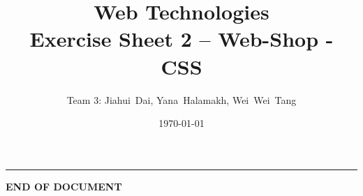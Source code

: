 \documentclass[a4paper,12pt]{article} %
\title{Web Technologies \\
        \large{Exercise Sheet 2 -- Web-Shop - CSS}} %
\author{Team 3: Jiahui~Dai, Yana~Halamakh, Wei~Wei~Tang} %
\date{\today} %
\begin{document}
\maketitle %
\hrule %
\tableofcontents %
\newpage










\begin{center}
    \vspace{5em}
    \textbf{END OF DOCUMENT}
\end{center}
\end{document}
